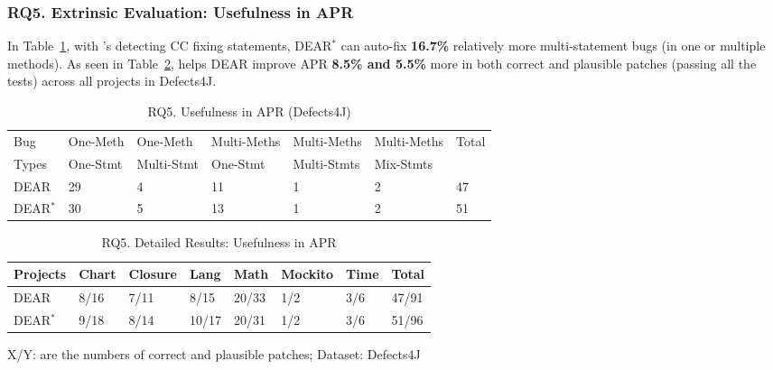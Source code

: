 \subsubsection{\bf RQ5. Extrinsic Evaluation: Usefulness in APR}
In Table~\ref{RQ5_1}, with {\tool}'s detecting CC fixing
statements, DEAR$^{*}$ can auto-fix {\bf 16.7\%} relatively more
multi-statement bugs (in one or multiple methods). As seen in
Table~\ref{RQ5_2}, {\tool} helps DEAR improve APR {\bf 8.5\% and 5.5\%} more in
both correct and plausible patches (passing all the tests) across all
projects in Defects4J.

\begin{table}[t]
	\caption{RQ5. Usefulness in APR (Defects4J)}
	\vspace{-12pt}
	\begin{center}
        \tabcolsep 2pt
		\footnotesize
		\renewcommand{\arraystretch}{1} 
		\begin{tabular}{p{0.7cm}<{\centering}|p{1.1cm}<{\centering}|p{1.1cm}<{\centering}|p{1.3cm}<{\centering}|p{1.3cm}<{\centering}|p{1.3cm}<{\centering}|p{0.7cm}<{\centering}}
			\hline
			Bug & One-Meth & One-Meth & Multi-Meths & Multi-Meths & Multi-Meths & Total\\
			Types          & One-Stmt & Multi-Stmt & One-Stmt & Multi-Stmts & Mix-Stmts & \\\hline
			DEAR & 29 & 4 & 11 & 1 & 2 & 47\\
			DEAR$^{*}$ & 30 & 5 & 13 & 1 & 2 & 51\\ 
			\hline
		\end{tabular}
		\label{RQ5_1}
	\end{center}
\vspace{-5pt}
\end{table}

\begin{table}[t]
	\caption{RQ5. Detailed Results: Usefulness in APR}
	\vspace{-10pt}
	\begin{center}
        \footnotesize
		\renewcommand{\arraystretch}{1} 
		\begin{tabular}{l|p{0.6cm}<{\centering}p{0.6cm}<{\centering}p{0.6cm}<{\centering}p{0.6cm}<{\centering}p{0.8cm}<{\centering}p{0.6cm}<{\centering}|p{0.5cm}<{\centering}}
			\hline
			Projects  & Chart & Closure & Lang & Math & Mockito & Time & Total\\
			\hline
			DEAR  & 8/16  &  7/11     & 8/15 & 20/33 & 1/2     & 3/6  & 47/91\\
		        DEAR$^{*}$ & 9/18  &  8/14     & 10/17 & 20/31 & 1/2     & 3/6  & 51/96\\
			\hline
		\end{tabular}
		
		{\footnotesize X/Y: are the numbers of correct and plausible patches; Dataset: Defects4J}
		\label{RQ5_2}
	\end{center}
\vspace{-5pt}
\end{table}
